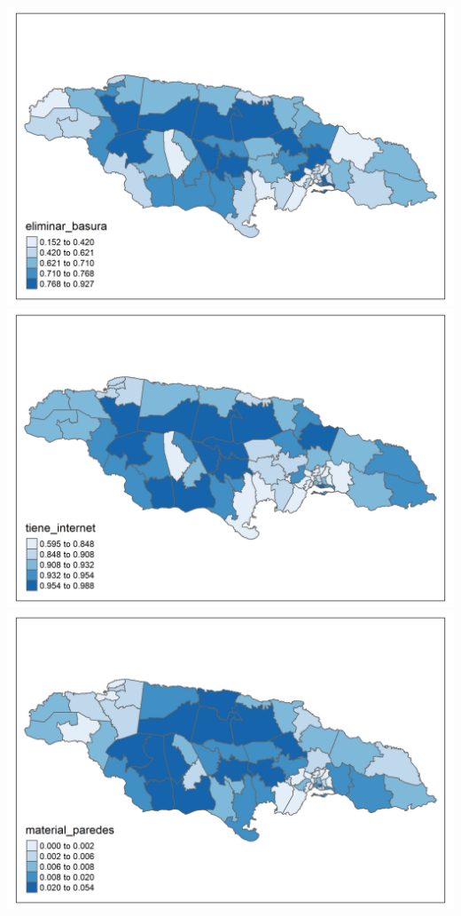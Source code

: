 \documentclass[
  12pt,
]{book}
\begin{document}
\includegraphics[width=4\linewidth]{Recursos/01_Session1/18_plot_Censo/eliminar_basura}
\includegraphics[width=4\linewidth]{Recursos/01_Session1/18_plot_Censo/tiene_internet}
\includegraphics[width=4\linewidth]{Recursos/01_Session1/18_plot_Censo/material_paredes}
\end{document}
